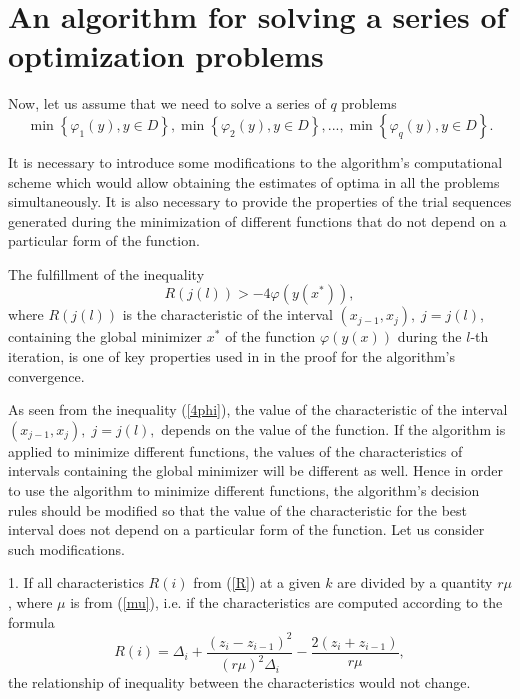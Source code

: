 \documentclass[smallcondensed]{svjour3}     %
\begin{document}
\section{An algorithm for solving a series of optimization problems} \label{sec:2}

Now, let us assume that we need to solve a series of $q$ problems 
\[
\min\left\{\varphi_1(y), y\in D \right\}, \min\left\{\varphi_2(y), y\in D\right\},..., \min\left\{\varphi_q(y), y\in D\right\}.
\]

It is necessary to introduce some modifications to the algorithm's computational scheme which would allow obtaining the estimates of optima in all the problems simultaneously. It is also necessary to provide the properties of the trial sequences generated during the minimization of different functions that do not depend on a particular form of the function.

The fulfillment of the inequality  
\begin{equation}\label{4phi}
R(j(l))>-4\varphi(y(x^\ast)),
\end{equation}
where $R(j(l))$ is the characteristic of the interval $(x_{j-1},x_j), \; j=j(l),$ containing the global minimizer $x^\ast$ of the function $\varphi(y(x))$ during the $l$-th iteration, is one of key properties used in \cite{Strongin2000} in the proof for the algorithm's convergence. 

As seen from the inequality (\ref{4phi}), the value of the characteristic of the interval $(x_{j-1},x_j), \; j=j(l),$ depends on the value of the function. If the algorithm is applied to minimize different functions, the values of the characteristics of intervals containing the global minimizer will be different as well. Hence in order to use the algorithm to minimize different functions, the algorithm's decision rules should be modified so that the value of the characteristic for the best interval does not depend on a particular form of the function. Let us consider such modifications.

1. If all characteristics $R(i)$ from (\ref{R}) at a given $k$ are divided by a quantity $r\mu$, where $\mu$ is from (\ref{mu}), i.e. if the characteristics are computed according to the formula
\[
R(i)=\Delta_i+\frac{(z_i-z_{i-1})^2}{(r\mu)^2\Delta_i}-\frac{2(z_i+z_{i-1})}{r\mu},
\]
the relationship of inequality between the characteristics would not change.
\end{document}
